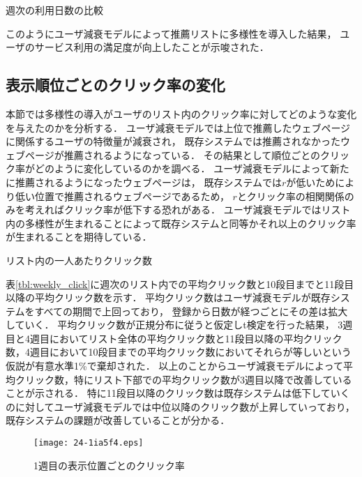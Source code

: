 \documentclass[japanese]{jnlp_1.4}
\begin{document}
\begin{table}[b]
\caption{週次の利用日数の比較}
\label{tbl:weekly_active}

\end{table}

このようにユーザ減衰モデルによって推薦リストに多様性を導入した結果，
ユーザのサービス利用の満足度が向上したことが示唆された．


\subsection{表示順位ごとのクリック率の変化}

本節では多様性の導入がユーザのリスト内のクリック率に対してどのような変化を与えたのかを分析する．
ユーザ減衰モデルでは上位で推薦したウェブページに関係するユーザの特徴量が減衰され，
既存システムでは推薦されなかったウェブページが推薦されるようになっている．
その結果として順位ごとのクリック率がどのように変化しているのかを調べる．
ユーザ減衰モデルによって新たに推薦されるようになったウェブページは，
既存システムでは$r$が低いためにより低い位置で推薦されるウェブページであるため，
$r$とクリック率の相関関係のみを考えればクリック率が低下する恐れがある．
ユーザ減衰モデルではリスト内の多様性が生まれることによって既存システムと同等かそれ以上のクリック率が生まれることを期待している．

\begin{table}[b]
\vspace{-0.5\Cvs}
\caption{リスト内の一人あたりクリック数}
\label{tbl:weekly_click}

\end{table}

表\ref{tbl:weekly_click}に週次のリスト内での平均クリック数と10段目までと11段目以降の平均クリック数を示す．
平均クリック数はユーザ減衰モデルが既存システムをすべての期間で上回っており，
登録から日数が経つごとにその差は拡大していく．
平均クリック数が正規分布に従うと仮定しt検定を行った結果，
3週目と4週目においてリスト全体の平均クリック数と11段目以降の平均クリック数，4週目において10段目までの平均クリック数においてそれらが等しいという仮説が有意水準1\%で棄却された．
以上のことからユーザ減衰モデルによって平均クリック数，特にリスト下部での平均クリック数が3週目以降で改善していることが示される．
特に11段目以降のクリック数は既存システムは低下していくのに対してユーザ減衰モデルでは中位以降のクリック数が上昇していっており，
既存システムの課題が改善していることが分かる．

\begin{figure}[b]
\begin{center}
\texttt{[image: 24-1ia5f4.eps]}
\end{center}
\caption{1週目の表示位置ごとのクリック率}
\label{fig:purposed_rank_1week}
\end{figure}
\end{document}
